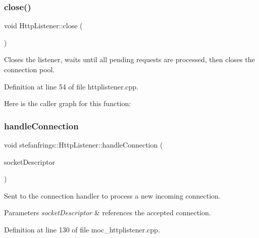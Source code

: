 \subsubsection{\texorpdfstring{close()}{close()}}
{\footnotesize\ttfamily void Http\+Listener\+::close (\begin{DoxyParamCaption}{ }\end{DoxyParamCaption})}

Closes the listener, waits until all pending requests are processed, then closes the connection pool. 

Definition at line 54 of file httplistener.\+cpp.

Here is the caller graph for this function\+:
\mbox{\label{classstefanfrings_1_1_http_listener_a60065df255188a04088d3a7c0b3def44}} 
\subsubsection{\texorpdfstring{handle\+Connection}{handleConnection}}
{\footnotesize\ttfamily void stefanfrings\+::\+Http\+Listener\+::handle\+Connection (\begin{DoxyParamCaption}\item[{\mbox{\hyperlink{httpconnectionhandler_8h_a9884f8c3364a6510f6118c5336fd0458}{t\+Socket\+Descriptor}}}]{socket\+Descriptor }\end{DoxyParamCaption})\hspace{0.3cm}{\ttfamily [signal]}}

Sent to the connection handler to process a new incoming connection. 
\begin{DoxyParams}{Parameters}
{\em socket\+Descriptor} & references the accepted connection. \\
\hline
\end{DoxyParams}


Definition at line 130 of file moc\+\_\+httplistener.\+cpp.

\mbox{\label{classstefanfrings_1_1_http_listener_a72530470ad6a62487b7b0d3d5c79d7b9}} 
